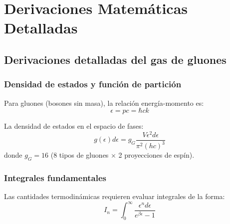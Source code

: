 \chapter{Derivaciones Matemáticas Detalladas}\label{app:math_derivations}

\pagestyle{fancy}
\fancyhf{} %
\fancyhead[RE]{\nouppercase{\hfill \textbf{\leftmark}}} %
\fancyhead[LO]{\nouppercase{\textbf{\leftmark} \hfill}} %

\section{Derivaciones detalladas del gas de gluones}
\label{app:BE_derivation}

\subsection{Densidad de estados y función de partición}
Para gluones (bosones sin masa), la relación energía-momento es:
\begin{equation}
\epsilon = pc = \hbar c k
\end{equation}

La densidad de estados en el espacio de fases:
\begin{equation}
g(\epsilon)d\epsilon = g_G \frac{V \epsilon^2 d\epsilon}{\pi^2 (hc)^3}
\end{equation}
donde $g_G = 16$ (8 tipos de gluones $\times$ 2 proyecciones de espín).

\subsection{Integrales fundamentales}
Las cantidades termodinámicas requieren evaluar integrales de la forma:
\begin{equation}
I_n = \int_0^\infty \frac{\epsilon^n d\epsilon}{e^{\beta\epsilon} - 1}
\end{equation}

